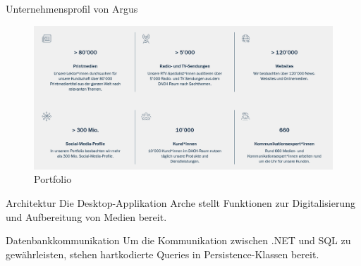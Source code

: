\documentclass{beamer}
\makeatletter
\newcommand*{\currentname}{\@currentlabelname}
\makeatother
\begin{document}
        \begin{frame}{Unternehmensprofil von Argus}
            \begin{figure}[htp]
                \centering
                \includegraphics[scale=0.23]{ArgusProfil.png}
                \caption{Portfolio}
                \label{fig:my_label}
            \end{figure}
        \end{frame}            
        
        \begin{frame}{\insertsectionnumber\space \currentname}
            \begin{block}{Architektur}
                Die Desktop-Applikation \glqq Arche\grqq{} stellt Funktionen zur Digitalisierung und Aufbereitung von Medien bereit.
            \end{block}
            \begin{block}{Datenbankkommunikation}
                Um die Kommunikation zwischen .NET und SQL zu gewährleisten, stehen hartkodierte Queries in Persistence-Klassen bereit.
            \end{block}
        \end{frame}
                
            
            
            
           
            
        
\end{document}
